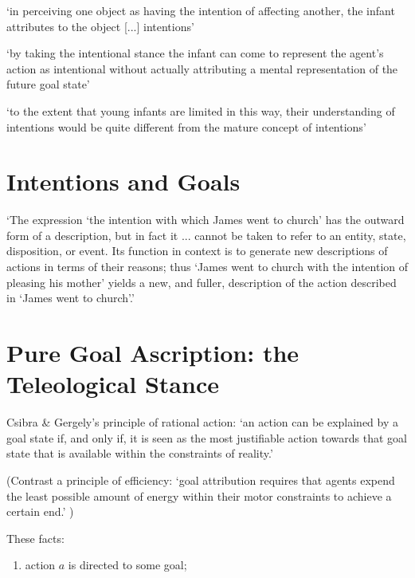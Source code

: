 \documentclass[12pt]{extarticle}
\begin{document}
\begin{multicols}{3}
‘in perceiving one object as having the intention of affecting another, the infant attributes to the object [...] intentions’
\citep[p.\ 14]{Premack:1990jl}
 
‘by taking the intentional stance the infant can come to represent the agent’s action as intentional without actually attributing a mental representation of the future goal state’
\citep[p.\ 188]{Gergely:1995sq}
 
‘to the extent that young infants are limited in this way, their understanding of intentions would be quite different from the mature concept of intentions’
\citep[p.\ 168]{woodward:2001_making}
 
 
 
\section{Intentions and Goals}
 
`The expression `the intention with which James went to church' has the outward form of a description, but in fact it
 ... cannot be taken to refer to an entity, state, disposition, or event. Its function in context is to generate new descriptions of actions in terms of their reasons; thus `James went to church with the intention of pleasing his mother' yields a new, and fuller, description of the action described in `James went to church'.'
\citep[p.\ 690]{davidson:1963_orig}
 
 
 
\section{Pure Goal Ascription: the Teleological Stance}
 
Csibra \& Gergely's principle of rational action: `an action can be explained by a goal state if, and only if, it is seen as the most justifiable action towards that goal state that is available within the constraints of reality.'\citep{Csibra:1998cx,Csibra:2003jv}
 
(Contrast a principle of efficiency:
`goal attribution requires that agents expend the least possible amount of energy within their motor constraints to achieve a certain end.' \citep%
{Southgate:2008el})
 
These facts:
 
\begin{enumerate}
 
\item action $a$ is directed to some goal;
 

\end{enumerate}
\end{multicols}
\end{document}
